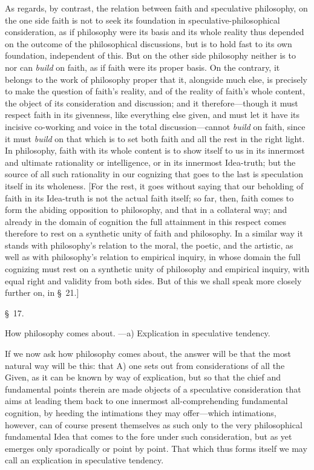 \documentclass[12pt,a4paper]{book}
\begin{document}
As regards, by contrast, the relation between faith and speculative philosophy, on
the one side faith is not to seek its foundation in speculative-philosophical
consideration, as if philosophy were its basis and its whole reality thus depended
on the outcome of the philosophical discussions, but is to hold fast to its own
foundation, independent of this. But on the other side philosophy neither is to nor
can \emph{build} on faith, as if faith were its proper basis. On the contrary, it
belongs to the work of philosophy proper that it, alongside much else, is precisely
to make the question of faith's reality, and of the reality of faith's whole
content, the object of its consideration and discussion; and it therefore---though
it must respect faith in its givenness, like everything else given, and must let it
have its incisive co-working and voice in the total discussion---cannot \emph{build}
on faith, since it must \emph{build} on that which is to set both faith and all the
rest in the right light. In philosophy, faith with its whole content is to show
itself to us in its innermost and ultimate rationality or intelligence, or in its
innermost Idea-truth; but the source of all such rationality in our cognizing that
goes to the last is speculation itself in its wholeness. [For the rest, it goes
without saying that our beholding of faith in its Idea-truth is not the actual faith
itself; so far, then, faith comes to form the abiding opposition to philosophy, and
that in a collateral way; and already in the domain of cognition the full attainment
in this respect comes therefore to rest on a synthetic unity of faith and
philosophy. In a similar way it stands with philosophy's relation to the moral, the
poetic, and the artistic, as well as with philosophy's relation to empirical
inquiry, in whose domain the full cognizing must rest on a synthetic unity of
philosophy and empirical inquiry, with equal right and validity from both sides. But
of this we shall speak more closely further on, in \S~21.]

\begin{center}\large\S~17.\end{center}
\begin{center}How philosophy comes about. ---a) Explication in speculative tendency.\end{center}

If we now ask how philosophy comes about, the answer will be that the most natural
way will be this: that A) one sets out from considerations of all the Given, as it
can be known by way of explication, but so that the chief and fundamental points
therein are made objects of a speculative consideration that aims at leading them
back to one innermost all-comprehending fundamental cognition, by heeding the
intimations they may offer---which intimations, however, can of course present
themselves as such only to the very philosophical fundamental Idea that comes to the
fore under such consideration, but as yet emerges only sporadically or point by
point. That which thus forms itself we may call an explication in speculative
tendency.
\end{document}
